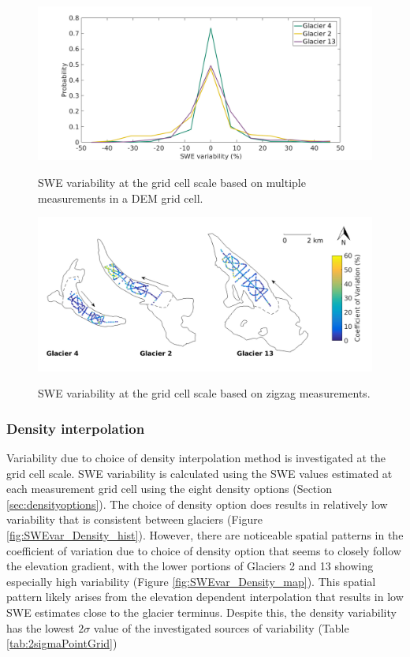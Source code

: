 \documentclass{sfuthesis}
\begin{document}
\begin{figure}[H]
	\centering
	\includegraphics[width =\textwidth]{SWEvarMeasureLocHIST.png}\\
	\caption{SWE variability at the grid cell scale based on multiple measurements in a DEM grid cell.}
	\label{fig:SWEvar_MultLoc_hist}
\end{figure}

\begin{figure}[H]
	\centering
	\includegraphics[width =\textwidth]{Map_cellstd_measureLoc.png}\\
	\caption{SWE variability at the grid cell scale based on zigzag measurements.}
	\label{fig:SWEvar_MultLoc_map}
\end{figure}

\subsubsection{Density interpolation}

Variability due to choice of density interpolation method is investigated at the grid cell scale. SWE variability is calculated using the SWE values estimated at each measurement grid cell using the eight density options (Section \ref{sec:densityoptions}). The choice of density option does results in relatively low variability that is consistent between glaciers (Figure \ref{fig:SWEvar_Density_hist}). However, there are noticeable spatial patterns in the coefficient of variation due to choice of density option that seems to closely follow the elevation gradient, with the lower portions of Glaciers 2 and 13 showing especially high variability (Figure \ref{fig:SWEvar_Density_map}). This spatial pattern likely arises from the elevation dependent interpolation that results in low SWE estimates close to the glacier terminus. Despite this, the density variability has the lowest $2\sigma$ value of the investigated sources of variability (Table  \ref{tab:2sigmaPointGrid})
\end{document}

